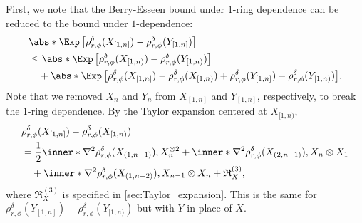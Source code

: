 \documentclass[aos]{imsart}
\begin{document}
\begin{appendix}
\medskip
{} First, we note that the Berry-Esseen bound under $1$-ring dependence can be reduced to the bound under $1$-dependence:
\begin{equation} \label{eq:breaking_ring}
\begin{aligned}
    & \abs*{ \Exp\left[\rho_{r,\phi}^\delta(X_{[1,n]}) - \rho_{r,\phi}^\delta(Y_{[1,n]})\right]} \\
    & \leq \abs*{ \Exp\left[\rho_{r,\phi}^\delta(X_{[1,n)}) - \rho_{r,\phi}^\delta(Y_{[1,n)})\right]} \\
    & \quad + \abs*{ \Exp\left[ \rho_{r,\phi}^\delta(X_{[1,n]}) - \rho_{r,\phi}^\delta(X_{[1,n)}) + \rho_{r,\phi}^\delta(Y_{[1,n]}) - \rho_{r,\phi}^\delta(Y_{[1,n)})\right]}.
\end{aligned}
\end{equation}
Note that we removed $X_n$ and $Y_n$ from $X_{[1,n]}$ and $Y_{[1,n]}$, respectively, to break the $1$-ring dependence. By the Taylor expansion centered at $X_{[1,n)}$,
\begin{equation} \label{eq:zeroth_taylor_expansion_3P}
\begin{aligned}
    & \rho_{r,\phi}^{\delta}(X_{[1,n]}) - \rho_{r,\phi}^\delta(X_{[1,n)}) \\
    & = \frac{1}{2} \inner*{\nabla^2 \rho_{r,\phi}^\delta(X_{(1,n-1)}), X_n^{\otimes 2}}
    + \inner*{\nabla^2 \rho_{r,\phi}^\delta(X_{(2,n-1)}), X_n \otimes X_1} \\
    & \quad + \inner*{\nabla^2 \rho_{r,\phi}^\delta(X_{(1,n-2)}), X_{n-1} \otimes X_n} 
    + \mathfrak{R}_X^{(3)},
\end{aligned}
\end{equation}
where $\mathfrak{R}_X^{(3)}$ is specified in \cref{sec:Taylor_expansion}. This is the same for $\rho_{r,\phi}^{\delta}(Y_{[1,n]}) - \rho_{r,\phi}^\delta(Y_{[1,n)})$ but with $Y$ in place of $X$.





\end{appendix}
\end{document}
